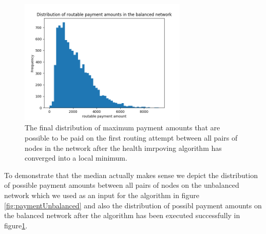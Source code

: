 \documentclass[a4paper]{paper}
\begin{document}
\begin{figure}
 \centering
 \includegraphics[width=8cm]{code/results/routabilityTest/paymentamtBalanced.png}
 \caption{The final distribution of maximum payment amounts that are possible to be paid on the first routing attempt between all pairs of nodes in the network after the health imrpoving algorithm has converged into a local minimum.}
 \label{fig:paymentBalanced}
\end{figure}
To demonstrate that the median actually makes sense we depict the distribution of possible payment amounts between all pairs of nodes on the unbalanced network which we used as an input for the algorithm in figure \ref{fig:paymentUnbalanced} and also the distribution of possibl payment amounts on the balanced network after the algorithm has been executed successfully in figure\ref{fig:paymentBalanced}.
\end{document}
